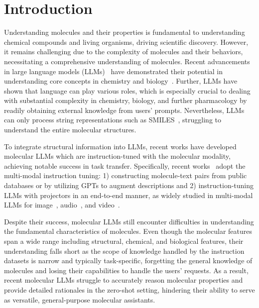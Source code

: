 \vspace{-0.2in}
\section{Introduction}
\vspace{-0.05in}
Understanding molecules and their properties is fundamental to understanding chemical compounds and living organisms, driving scientific discovery. However, it remains challenging due to the complexity of molecules and their behaviors, necessitating a comprehensive understanding of molecules. Recent advancements in large language models (LLMs)~\cite{touvron2023llama2,grattafiori2024llama3,openai2024gpt4,openai2024gpt4ocard} have demonstrated their potential in understanding core concepts in chemistry and biology~\cite{ai4science2023impactlargelanguagemodels,sadeghi2024can}. Further, LLMs have shown that language can play various roles, which is especially crucial to dealing with substantial complexity in chemistry, biology, and further pharmacology by readily obtaining external knowledge from users' prompts. Nevertheless, LLMs can only process string representations such as SMILES~\cite{weininger1988smiles}, struggling to understand the entire molecular structures.

To integrate structural information into LLMs, recent works have developed molecular LLMs which are instruction-tuned with the molecular modality, achieving notable success in task transfer. Specifically, recent works~\cite{liu-etal-2023-molca,cao2023instructmol,fang2023molinstruction,zhang2024unimot,li2024molm,park2024llamo,yu2024llasmol} adopt the multi-modal instruction tuning: 1) constructing molecule-text pairs from public databases or by utilizing GPTs to augment descriptions and 2) instruction-tuning LLMs with projectors in an end-to-end manner, as widely studied in multi-modal LLMs for image~\cite{li2023BLIP2,liu2024LLAVA1.5}, audio~\cite{fathullah2024audiochatllama}, and video~\cite{chen2023videollm,zhang2023videoLLAMA,maaz2024videochatgpt}. 

Despite their success, molecular LLMs still encounter difficulties in understanding the fundamental characteristics of molecules. Even though the molecular features span a wide range including structural, chemical, and biological features, their understanding falls short as the scope of knowledge handled by the instruction datasets is narrow and typically task-specific, forgetting the general knowledge of molecules and losing their capabilities to handle the users' requests. As a result, recent molecular LLMs struggle to accurately reason molecular properties and provide detailed rationales in the zero-shot setting, hindering their ability to serve as versatile, general-purpose molecular assistants.

